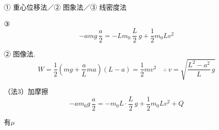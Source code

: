 ① 重心位移法\quad／\quad ② 图象法\quad／\quad ③ 线密度法



③
\[ -a m g\,\frac{a}{2} = -L m_0\,\frac{L}{2}\,g + \frac{1}{2}m_0 L v^2 \]%

② 图像法.
\[ W=\frac{1}{2}\left(mg+\frac{a}{L}ma\right)(L-a)=\frac{1}{2}mv^2 \quad\therefore\ v=\sqrt{\frac{L^2-a^2}{L}\,g} \]%

（法3）加摩擦
\[ -a m_0 g\,\frac{a}{2} = -m_0 L\cdot\frac{L}{2}\,g + \frac{1}{2}m_0 L v^2 + Q \]

有$\mu$

